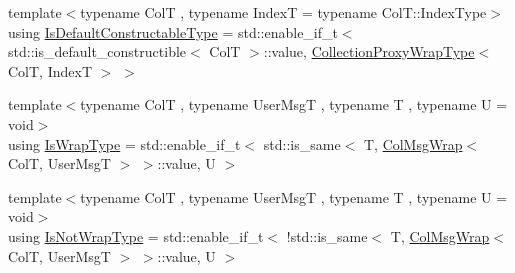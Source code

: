 \begin{DoxyCompactItemize}
\item 
{\footnotesize template$<$typename ColT , typename IndexT  = typename Col\+T\+::\+Index\+Type$>$ }\\using \hyperlink{structvt_1_1vrt_1_1collection_1_1_collection_manager_af8091fcb8218dad155ea028c9b5d283f}{Is\+Default\+Constructable\+Type} = std\+::enable\+\_\+if\+\_\+t$<$ std\+::is\+\_\+default\+\_\+constructible$<$ ColT $>$\+::value, \hyperlink{structvt_1_1vrt_1_1collection_1_1_collection_manager_a56458ed7f9bb22b631b9b3a745f42f94}{Collection\+Proxy\+Wrap\+Type}$<$ ColT, IndexT $>$ $>$
\item 
{\footnotesize template$<$typename ColT , typename User\+MsgT , typename T , typename U  = void$>$ }\\using \hyperlink{structvt_1_1vrt_1_1collection_1_1_collection_manager_a1f91c97ed52237c3a3576dfbbe87c8f8}{Is\+Wrap\+Type} = std\+::enable\+\_\+if\+\_\+t$<$ std\+::is\+\_\+same$<$ T, \hyperlink{structvt_1_1vrt_1_1collection_1_1_col_msg_wrap}{Col\+Msg\+Wrap}$<$ ColT, User\+MsgT $>$ $>$\+::value, U $>$
\item 
{\footnotesize template$<$typename ColT , typename User\+MsgT , typename T , typename U  = void$>$ }\\using \hyperlink{structvt_1_1vrt_1_1collection_1_1_collection_manager_a18e3a17d9eb086c6c2f499242b7faa1e}{Is\+Not\+Wrap\+Type} = std\+::enable\+\_\+if\+\_\+t$<$ !std\+::is\+\_\+same$<$ T, \hyperlink{structvt_1_1vrt_1_1collection_1_1_col_msg_wrap}{Col\+Msg\+Wrap}$<$ ColT, User\+MsgT $>$ $>$\+::value, U $>$
\end{DoxyCompactItemize}
